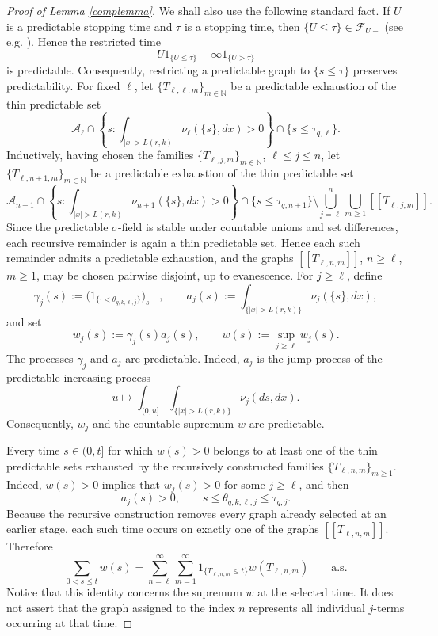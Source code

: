 \documentclass[a4paper,10pt]{article}
\begin{document}
\begin{proof}[Proof of Lemma \ref{complemma}]
We shall also use the following standard fact. If \(U\) is a predictable
stopping time and \(\tau\) is a stopping time, then
\(\{U\le \tau\}\in\mathcal F_{U-}\) (see e.g. \cite{JacodShiryaev}).
Hence the restricted time
\[
U1_{\{U\le \tau\}}+\infty 1_{\{U>\tau\}}
\]
is predictable. Consequently, restricting a predictable graph to
\(\{s\le\tau\}\) preserves predictability.
For fixed \(\ell\), let \(\{T_{\ell,\ell,m}\}_{m\in\mathbb N}\) be a
predictable exhaustion of the thin predictable set
\[
\mathcal{A}_\ell\cap
\left\{
s:
\int_{|x|>L(r,k)}\nu_\ell(\{s\},dx)>0
\right\}
\cap \{s\le \tau_{q,\ell}\}.
\]
Inductively, having chosen the families
\(\{T_{\ell,j,m}\}_{m\in\mathbb N}\), \(\ell\le j\le n\), let
\(\{T_{\ell,n+1,m}\}_{m\in\mathbb N}\) be a predictable exhaustion of
the thin predictable set
\[
\mathcal{A}_{n+1}\cap
\left\{
s:
\int_{|x|>L(r,k)}\nu_{n+1}(\{s\},dx)>0
\right\}
\cap \{s\le \tau_{q,n+1}\}
\setminus
\bigcup_{j=\ell}^{n}\bigcup_{m\ge1} [[T_{\ell,j,m}]] .
\]
Since the predictable \(\sigma\)-field is stable under countable unions
and set differences, each recursive remainder is again a thin
predictable set. Hence each such
remainder admits a predictable exhaustion, and the graphs
\([[T_{\ell,n,m}]]\), \(n\ge\ell\), \(m\ge1\), may be chosen pairwise
disjoint, up to evanescence.
For \(j\ge\ell\), define
\[
\gamma_j(s)
:=
\bigl(
1_{\{\cdot<\theta_{q,k,\ell,j}\}}
\bigr)_{s-},
\qquad
a_j(s)
:=
\int_{\{|x|>L(r,k)\}}
\nu_j(\{s\},dx),
\]
and set
\[
        w_j(s):=\gamma_j(s)a_j(s),
        \qquad
        w(s):=\sup_{j\ge\ell}w_j(s).
\]
The processes \(\gamma_j\) and \(a_j\) are predictable. Indeed,
\(a_j\) is the jump process of the predictable increasing process
\[
u\longmapsto
\int_{(0,u]}\int_{\{|x|>L(r,k)\}}
\nu_j(ds,dx).
\]
Consequently, \(w_j\) and the countable supremum \(w\) are
predictable.

Every time \(s\in(0,t]\) for which \(w(s)>0\) belongs to at least one
of the thin predictable sets exhausted by the recursively constructed
families \(\{T_{\ell,n,m}\}_{m\ge1}\). Indeed, \(w(s)>0\) implies that
\(w_j(s)>0\) for some \(j\ge\ell\), and then
\[
        a_j(s)>0,
        \qquad
        s\le\theta_{q,k,\ell,j}
        \le\tau_{q,j}.
\]
Because the recursive construction removes every graph already
selected at an earlier stage, each such time occurs on exactly one of
the graphs \([[T_{\ell,n,m}]]\). Therefore
\[
\sum_{0<s\le t}w(s)
=
\sum_{n=\ell}^{\infty}
\sum_{m=1}^{\infty}
1_{\{T_{\ell,n,m}\le t\}}
w(T_{\ell,n,m})
\qquad\text{a.s.}
\]
Notice that this identity concerns the supremum \(w\) at the selected
time. It does not assert that the graph assigned to the index \(n\)
represents all individual \(j\)-terms occurring at that time.


\end{proof}
\end{document}
